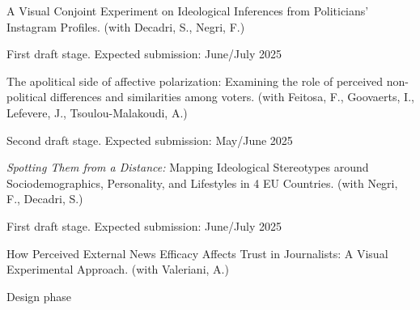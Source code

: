 \documentclass[10pt,]{article}
\providecommand{\tightlist}{%
  \setlength{\itemsep}{0pt}\setlength{\parskip}{0pt}}
\renewenvironment{itemize}{
  \begin{list}{}{
    \setlength{\leftmargin}{1.5em}
  }
}{
  \end{list}
}
\begin{document}
\begin{enumerate}
\def\labelenumi{\arabic{enumi}.}
\setcounter{enumi}{4}
\tightlist
\item
  A Visual Conjoint Experiment on Ideological Inferences from
  Politicians' Instagram Profiles. (with Decadri, S., Negri, F.)

  \begin{itemize}
  \tightlist
  \item
    First draft stage. Expected submission: June/July 2025
  \end{itemize}
\end{enumerate}

\begin{enumerate}
\def\labelenumi{\arabic{enumi}.}
\setcounter{enumi}{3}
\tightlist
\item
  The apolitical side of affective polarization: Examining the role of
  perceived non-political differences and similarities among voters.
  (with Feitosa, F., Goovaerts, I., Lefevere, J., Tsoulou-Malakoudi, A.)

  \begin{itemize}
  \tightlist
  \item
    Second draft stage. Expected submission: May/June 2025
  \end{itemize}
\end{enumerate}

\begin{enumerate}
\def\labelenumi{\arabic{enumi}.}
\setcounter{enumi}{2}
\tightlist
\item
  \emph{Spotting Them from a Distance:} Mapping Ideological Stereotypes
  around Sociodemographics, Personality, and Lifestyles in 4 EU
  Countries. (with Negri, F., Decadri, S.)

  \begin{itemize}
  \tightlist
  \item
    First draft stage. Expected submission: June/July 2025
  \end{itemize}
\end{enumerate}

\begin{enumerate}
\def\labelenumi{\arabic{enumi}.}
\setcounter{enumi}{1}
\tightlist
\item
  How Perceived External News Efficacy Affects Trust in Journalists: A
  Visual Experimental Approach. (with Valeriani, A.)

  \begin{itemize}
  \tightlist
  \item
    Design phase
  \end{itemize}
\end{enumerate}
\end{document}
